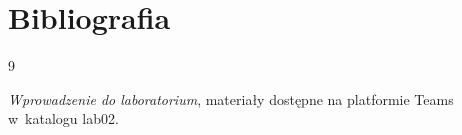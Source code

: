 \documentclass[12pt, a4paper]{article}
\begin{document}
\section*{Bibliografia}

\begin{thebibliography}{9}

  \textit{Wprowadzenie do laboratorium}, materia\l{}y dost\k{e}pne na platformie
  Teams w~katalogu lab02.

\end{thebibliography}
\end{document}
